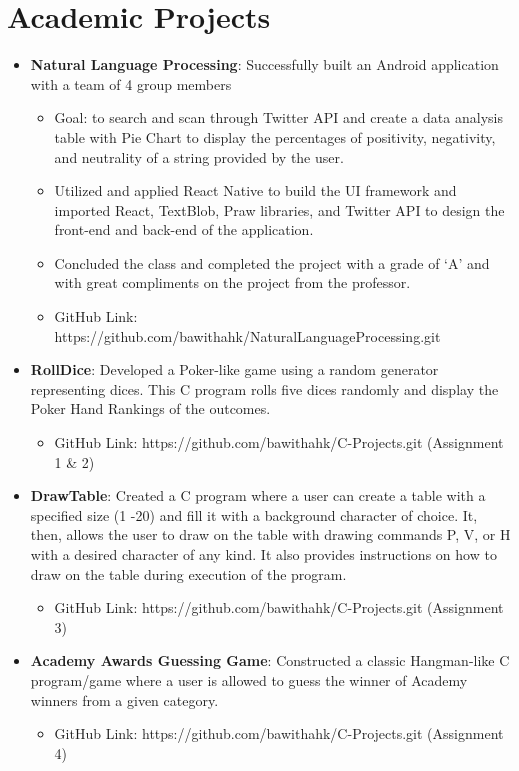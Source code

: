 \documentclass[letterpaper,11pt]{article}
\newcommand{\resumeItem}[2]{
  \item\small{
    \textbf{#1}{: #2 \vspace{-2pt}}
  }
}
\newcommand{\resumeSubItem}[2]{\resumeItem{#1}{#2}\vspace{-4pt}}
\newcommand{\resumeSubHeadingListStart}{\begin{itemize}[leftmargin=*]}
\newcommand{\resumeSubHeadingListEnd}{\end{itemize}}
\begin{document}
\section{Academic Projects}
  \resumeSubHeadingListStart
    \resumeSubItem{Natural Language Processing}
      {Successfully built an Android application with a team of 4 group members}
    \begin{itemize}
        \item Goal: to search and scan through Twitter API and create a data analysis table with Pie Chart to display the percentages of positivity, negativity, and neutrality of a string provided by the user.
        \item Utilized and applied React Native to build the UI framework and imported React, TextBlob, Praw libraries, and Twitter API to design the front-end and back-end of the application.
        \item Concluded the class and completed the project with a grade of ‘A’ and with great compliments on the project from the professor.
        \item GitHub Link: https://github.com/bawithahk/NaturalLanguageProcessing.git
    \end{itemize}
    \resumeSubItem{RollDice}
      {Developed a Poker-like game using a random generator representing dices. This C program rolls five dices randomly and display the Poker Hand Rankings of the outcomes.}
    \begin{itemize}
        \item GitHub Link: https://github.com/bawithahk/C-Projects.git (Assignment 1 \& 2)
    \end{itemize}
    \resumeSubItem{DrawTable}
      {Created a C program where a user can create a table with a specified size (1 -20) and fill it with a background character of choice. It, then, allows the user to draw on the table with drawing commands P, V, or H with a desired character of any kind. It also provides instructions on how to draw on the table during execution of the program.}
    \begin{itemize}
        \item GitHub Link: https://github.com/bawithahk/C-Projects.git (Assignment 3)
    \end{itemize}
    \resumeSubItem{Academy Awards Guessing Game}
     {Constructed a classic Hangman-like C program/game where a user is allowed to guess the winner of Academy winners from a given category.}
    \begin{itemize}
        \item GitHub Link: https://github.com/bawithahk/C-Projects.git (Assignment 4)
    \end{itemize}
  \resumeSubHeadingListEnd
\end{document}
